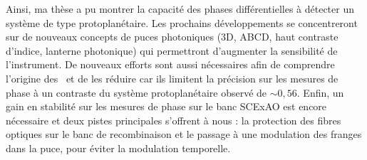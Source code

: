 Ainsi, ma thèse a pu montrer la capacité des phases différentielles à détecter un système de type protoplanétaire. Les prochains développements se concentreront sur de nouveaux concepts de puces photoniques (3D, ABCD, haut contraste d'indice, lanterne photonique) qui permettront d'augmenter la sensibilité de l'instrument. De nouveaux efforts sont aussi nécessaires afin de comprendre l'origine des \wiggles~et de les réduire car ils limitent la précision sur les mesures de phase à un contraste du système protoplanétaire observé de $\sim 0,56$. Enfin, un gain en stabilité sur les mesures de phase sur le banc SCExAO est encore nécessaire et deux pistes principales s'offrent à nous : la protection des fibres optiques sur le banc de recombinaison et le passage à une modulation des franges dans la puce, pour éviter la modulation temporelle.

